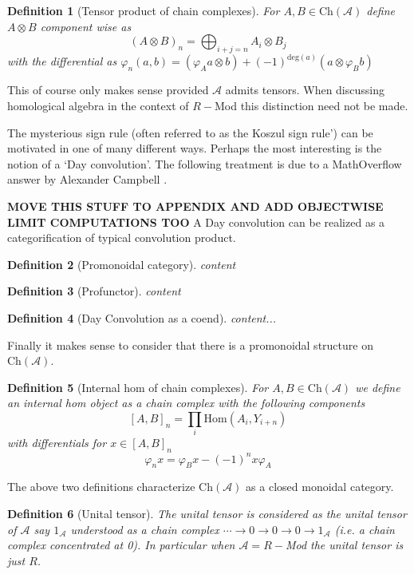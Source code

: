 \documentclass[12pt]{article}
\numberwithin{equation}{section}
\newtheorem{definition}{Definition}[section]
\begin{document}
	\begin{definition}[Tensor product of chain complexes]\label{tensorchain}
		For $A, B \in \mathrm{Ch}(\mathcal{A})$ define $A \otimes B$ component wise as \[ (A \otimes B)_n = \bigoplus_{i+j=n} A_i \otimes B_j\] with the differential as $ \varphi_n(a,b)=(\varphi_Aa\otimes b)+(-1)^{\mathrm{deg}(a)}(a \otimes \varphi_B b)$
	\end{definition}
	This of course only makes sense provided $\mathcal{A}$ admits tensors. When discussing homological algebra in the context of $R-$Mod this distinction need not be made.
	
	The mysterious sign rule (often referred to as the Koszul sign rule') can be motivated in one of many different ways. Perhaps the most interesting is the notion of a `Day convolution'. The following treatment is due to a MathOverflow answer by Alexander Campbell \cite{359316}.
	
	\textbf{MOVE THIS STUFF TO APPENDIX AND ADD OBJECTWISE LIMIT COMPUTATIONS TOO}
	A Day convolution can be realized as a categorification of typical convolution product.
	\begin{definition}[Promonoidal category]
		content
	\end{definition}
	\begin{definition}[Profunctor]
		content
	\end{definition}
	\begin{definition}[Day Convolution as a coend]
		content...
	\end{definition}
	Finally it makes sense to consider that there is a promonoidal structure on $\mathrm{Ch}(\mathcal{A})$.
		
	\begin{definition}[Internal hom of chain complexes]\label{internalchain}
		For $A,B \in \mathrm{Ch}(\mathcal{A})$ we define an internal hom object as a chain complex with the following components
		\[ [A,B]_n=\prod_i \mathrm{Hom}(A_i,Y_{i+n})\]
		with differentials for $x \in [A,B]_n$
		\[ \varphi_n x= \varphi_B x-(-1)^n x \varphi_A \]
	\end{definition}
	The above two definitions characterize $\mathrm{Ch}(\mathcal{A})$ as a closed monoidal category. 
	\begin{definition}[Unital tensor]\label{chunittensor}
			The unital tensor is considered as the unital tensor of $\mathcal{A}$ say $1_\mathcal{A}$ understood as a chain complex $\cdots \to 0\to0 \to 0 \to 1_\mathcal{A}$ (i.e. a chain complex concentrated at 0). In particular when $\mathcal{A}=R-$Mod the unital tensor is just $R$.
	\end{definition}
\end{document}
